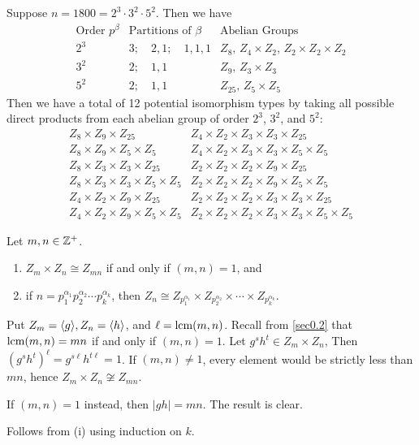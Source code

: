 \ex Suppose $n = 1800 = 2^3 \cdot 3^2 \cdot 5^2$. Then we have
\[
\begin{array}{c|c|c}
    \text{Order $p^\beta$} & \text{Partitions of $\beta$} & \text{Abelian Groups} \\
    \hline
    2^3 & 3; \quad 2, 1; \quad 1, 1, 1 & Z_{8}, \, Z_4 \times Z_2, \, Z_2 \times Z_2 \times Z_2 \\
    3^2 & 2; \quad 1, 1 & Z_9, \, Z_3 \times Z_3 \\
    5^2 & 2; \quad 1, 1 & Z_{25}, \, Z_5 \times Z_5
\end{array}\]
Then we have a total of 12 potential isomorphism types by taking all possible direct products from each abelian group of order $2^3$, $3^2$, and $5^2$:
\[
\begin{array}{ll}
    Z_8 \times Z_9 \times Z_{25} & Z_4 \times Z_2 \times Z_3 \times Z_3 \times Z_{25} \\
    Z_8 \times Z_9 \times Z_5 \times Z_5 & Z_4 \times Z_2 \times Z_3 \times Z_3 \times Z_5 \times Z_5 \\
    Z_8 \times Z_3 \times Z_3 \times Z_{25} & Z_2 \times Z_2 \times Z_2 \times Z_9 \times Z_{25} \\
    Z_8 \times Z_3 \times Z_3 \times Z_5 \times Z_5 & Z_2 \times Z_2 \times Z_2 \times Z_9 \times Z_5 \times Z_5 \\
    Z_4 \times Z_2 \times Z_9 \times Z_{25} & Z_2 \times Z_2 \times Z_2 \times Z_3 \times Z_3 \times Z_{25} \\
    Z_4 \times Z_2 \times Z_9 \times Z_5 \times Z_5 & Z_2 \times Z_2 \times Z_2 \times Z_3 \times Z_3 \times Z_5 \times Z_5
\end{array}\]

 \label{prop5.6}
Let $m, n \in \mathbb Z^+$.
\begin{enumerate}
    \item $Z_m \times Z_n \cong Z_{mn}$ if and only if $(m, n) = 1$, and
    \item if $n = p_1^{\alpha_1} p_2^{\alpha_2} \cdots p_k^{\alpha_k}$, then $Z_n \cong Z_{p_1^{\alpha_1}} \times Z_{p_2^{\alpha_2}} \times \cdots \times Z_{p_k^{\alpha_k}}$.
\end{enumerate}

\begin{proofnum}
    \item Put $Z_m = \langle g\rangle, Z_n = \langle h\rangle$, and $\ell = \operatorname{lcm}(m, n)$. Recall from \autoref{sec0.2} that $\operatorname{lcm}(m, n) = mn$ if and only if $(m, n) = 1$. Let $g^sh^t \in Z_m \times Z_n$, Then $(g^sh^t)^\ell = g^{s\ell}h^{t\ell} = 1$. If $(m, n) \neq 1$, every element would be strictly less than $mn$, hence $Z_m \times Z_n \not\cong Z_{mn}$.
    
    If $(m, n) = 1$ instead, then $|gh| = mn$. The result is clear.
    \item Follows from (i) using induction on $k$.
\end{proofnum}

